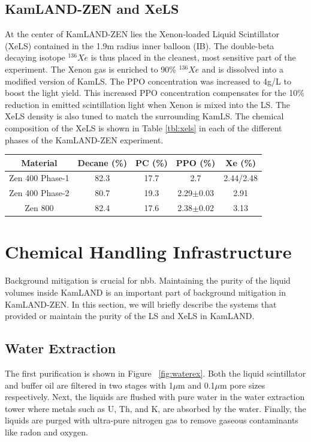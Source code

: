 \subsection{KamLAND-ZEN and XeLS}
At the center of KamLAND-ZEN lies the Xenon-loaded Liquid Scintillator (XeLS) contained in the 1.9m radius inner balloon (IB). The double-beta decaying isotope $^{136}Xe$ is thus placed in the cleanest, most sensitive part of the experiment. The Xenon gas is enriched to 90\% $^{136}Xe$ and is dissolved into a modified version of KamLS. The PPO concentration was increased to 4g/L to boost the light yield. This increased PPO concentration compensates for the 10\% reduction in emitted scintillation light when Xenon is mixed into the LS. The XeLS density is also tuned to match the surrounding KamLS. The chemical composition of the XeLS is shown in Table \ref{tbl:xels} in each of the different phases of the KamLAND-ZEN experiment.

\begin{table}[h]
	\centering
	\renewcommand{\arraystretch}{1.2}
	\begin{tabular}{c|cccc}
		\hline
		Material & Decane (\%) & PC (\%) & PPO (\%) & Xe (\%)\\ \hline
		Zen 400 Phase-1 & 82.3 & 17.7 & 2.7 & 2.44/2.48\\
		Zen 400 Phase-2 & 80.7 & 19.3 & 2.29$\pm$0.03 & 2.91\\
		Zen 800 & 82.4 & 17.6 & 2.38$\pm$0.02 & 3.13\\ \hline
	\end{tabular}
\end{table}

\section{Chemical Handling Infrastructure}
Background mitigation is crucial for \0nbb. Maintaining the purity of the liquid volumes inside KamLAND is an important part of background mitigation in KamLAND-ZEN. In this section, we will briefly describe the systems that provided or maintain the purity of the LS and XeLS in KamLAND.

\subsection{Water Extraction}
The first purification is shown in Figure ~\ref{fig:waterex}. Both the liquid scintillator and buffer oil are filtered in two stages with 1$\mu$m and 0.1$\mu$m pore sizes respectively. Next, the liquids are flushed with pure water in the water extraction tower where metals such as U, Th, and K, are absorbed by the water. Finally, the liquids are purged with ultra-pure nitrogen gas to remove gaseous contaminants like radon and oxygen.

